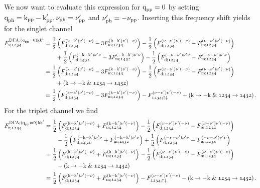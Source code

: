 \documentclass[main.tex]{subfiles}
\begin{document}
We now want to evaluate this expression for $\text{q}_{\text{pp}}=0$ by setting $\text{q}_{\text{ph}}=\text{k}_{\text{pp}}-\text{k}'_{\text{pp}}, \nu_{\text{ph}}=\nu'_{\text{pp}}$ and $\nu'_{\text{ph}}=-\nu_{\text{pp}}$. Inserting this frequency shift yields for the singlet channel
\begin{align}
\begin{split}
	F_{\text{s};\mathfrak{1234}}^{\text{D}\Gamma\text{A};(\text{q}_{\text{pp}}=0)\text{k}\text{k}'}&=\frac12\left (F_{\text{d};\mathfrak{1234}}^{(\text{k}-\text{k}')\nu'(-\nu)}-3F_{\text{m};\mathfrak{1234}}^{(\text{k}-\text{k}')\nu'(-\nu)}\right )-\frac12\left (F_{\text{d};\mathfrak{1234}}^{(\nu-\nu')\nu'(-\nu)}-F_{\text{m};\mathfrak{1234}}^{(\nu-\nu')\nu'(-\nu)}\right )\\
	&\qquad+\frac12\left (F_{\text{d};\mathfrak{1432}}^{(-\text{k}-\text{k}')\nu'\nu}-3F_{\text{m};\mathfrak{1432}}^{(-\text{k}-\text{k}')\nu'\nu}\right )-\frac12\left (F_{\text{d};\mathfrak{1234}}^{(-\nu-\nu')\nu'\nu}-F_{\text{m};\mathfrak{1234}}^{(-\nu-\nu')\nu'\nu}\right )\\
	&=\frac12\left (F_{\text{d};\mathfrak{1234}}^{(\text{k}-\text{k}')\nu'(-\nu)}-3F_{\text{m};\mathfrak{1234}}^{(\text{k}-\text{k}')\nu'(-\nu)}\right )-\frac12\left (F_{\text{d};\mathfrak{1234}}^{(\nu-\nu')\nu'(-\nu)}-F_{\text{m};\mathfrak{1234}}^{(\nu-\nu')\nu'(-\nu)}\right )\\
	&\qquad+ \left (\text{k}\rightarrow -\text{k}\;\&\; \mathfrak{1234}\rightarrow\mathfrak{1432}\right )\\
	&=\frac12\left (F_{\text{d};\mathfrak{1234}}^{(\text{k}-\text{k}')\nu'(-\nu)}-3F_{\text{m};\mathfrak{1234}}^{(\text{k}-\text{k}')\nu'(-\nu)}\right )-F_{\mathfrak{1234};\uparrow\downarrow}^{(\nu-\nu')\nu'(-\nu)}+ \left (\text{k}\rightarrow -\text{k}\;\&\; \mathfrak{1234}\rightarrow\mathfrak{1432}\right ).
\end{split}
\end{align}
For the triplet channel we find
\begin{align}
\begin{split}
	F_{\text{t};\mathfrak{1234}}^{\text{D}\Gamma\text{A};(\text{q}_{\text{pp}}=0)\text{k}\text{k}'}&=\frac12\left (F_{\text{d};\mathfrak{1234}}^{(\text{k}-\text{k}')\nu'(-\nu)}+F_{\text{m};\mathfrak{1234}}^{(\text{k}-\text{k}')\nu'(-\nu)}\right )-\frac12\left (F_{\text{d};\mathfrak{1234}}^{(\nu-\nu')\nu'(-\nu)}-F_{\text{m};\mathfrak{1234}}^{(\nu-\nu')\nu'(-\nu)}\right )\\
	&\qquad-\frac12\left (F_{\text{d};\mathfrak{1432}}^{(-\text{k}-\text{k}')\nu'\nu}+F_{\text{m};\mathfrak{1432}}^{(-\text{k}-\text{k}')\nu'\nu}\right )+\frac12\left (F_{\text{d};\mathfrak{1234}}^{(-\nu-\nu')\nu'\nu}-F_{\text{m};\mathfrak{1234}}^{(-\nu-\nu')\nu'\nu}\right )\\
	&=\frac12\left (F_{\text{d};\mathfrak{1234}}^{(\text{k}-\text{k}')\nu'(-\nu)}+F_{\text{m};\mathfrak{1234}}^{(\text{k}-\text{k}')\nu'(-\nu)}\right )-\frac12\left (F_{\text{d};\mathfrak{1234}}^{(\nu-\nu')\nu'(-\nu)}-F_{\text{m};\mathfrak{1234}}^{(\nu-\nu')\nu'(-\nu)}\right )\\
	&\qquad- \left (\text{k}\rightarrow -\text{k}\;\&\; \mathfrak{1234}\rightarrow\mathfrak{1432}\right )\\
	&=\frac12\left (F_{\text{d};\mathfrak{1234}}^{(\text{k}-\text{k}')\nu'(-\nu)}+F_{\text{m};\mathfrak{1234}}^{(\text{k}-\text{k}')\nu'(-\nu)}\right )-F_{\mathfrak{1234};\uparrow\downarrow}^{(\nu-\nu')\nu'(-\nu)}- \left (\text{k}\rightarrow -\text{k}\;\&\; \mathfrak{1234}\rightarrow\mathfrak{1432}\right ).
\end{split}
\end{align}
\end{document}

